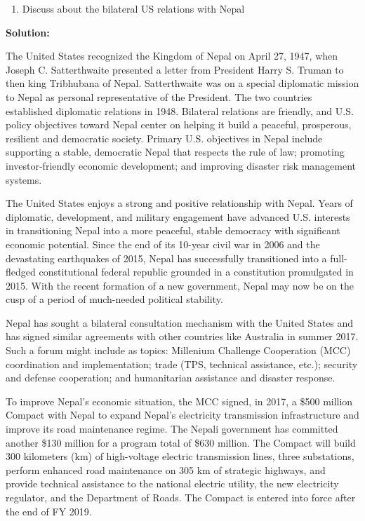 \documentclass[
]{book}
\providecommand{\tightlist}{%
  \setlength{\itemsep}{0pt}\setlength{\parskip}{0pt}}
\begin{document}
\begin{enumerate}
\def\labelenumi{\arabic{enumi}.}
\setcounter{enumi}{1}
\tightlist
\item
  Discuss about the bilateral US relations with Nepal
\end{enumerate}

\textbf{Solution:}

The United States recognized the Kingdom of Nepal on April 27, 1947, when Joseph C. Satterthwaite presented a letter from President Harry S. Truman to then king Tribhubana of Nepal. Satterthwaite was on a special diplomatic mission to Nepal as personal representative of the President. The two countries established diplomatic relations in 1948. Bilateral relations are friendly, and U.S. policy objectives toward Nepal center on helping it build a peaceful, prosperous, resilient and democratic society. Primary U.S. objectives in Nepal include supporting a stable, democratic Nepal that respects the rule of law; promoting investor-friendly economic development; and improving disaster risk management systems.

The United States enjoys a strong and positive relationship with Nepal. Years of diplomatic, development, and military engagement have advanced U.S. interests in transitioning Nepal into a more peaceful, stable democracy with significant economic potential. Since the end of its 10-year civil war in 2006 and the devastating earthquakes of 2015, Nepal has successfully transitioned into a full-fledged constitutional federal republic grounded in a constitution promulgated in 2015. With the recent formation of a new government, Nepal may now be on the cusp of a period of much-needed political stability.

Nepal has sought a bilateral consultation mechanism with the United States and has signed similar agreements with other countries like Australia in summer 2017. Such a forum might include as topics: Millenium Challenge Cooperation (MCC) coordination and implementation; trade (TPS, technical assistance, etc.); security and defense cooperation; and humanitarian assistance and disaster response.

To improve Nepal's economic situation, the MCC signed, in 2017, a \$500 million Compact with Nepal to expand Nepal's electricity transmission infrastructure and improve its road maintenance regime. The Nepali government has committed another \$130 million for a program total of \$630 million. The Compact will build 300 kilometers (km) of high-voltage electric transmission lines, three substations, perform enhanced road maintenance on 305 km of strategic highways, and provide technical assistance to the national electric utility, the new electricity regulator, and the Department of Roads. The Compact is entered into force after the end of FY 2019.
\end{document}
